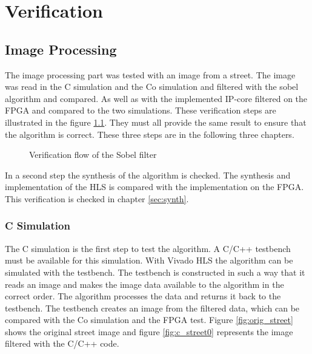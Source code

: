 \chapter{Verification} \label{chapt:verification}

%
%
\section{Image Processing}
The image processing part was tested with an image from a street. The image was read in the C simulation and the Co simulation and filtered with the sobel algorithm and compared. As well as with the implemented IP-core filtered on the FPGA and compared to the two simulations. These verification steps are illustrated in the figure \ref{fig:ip_validation}. They must all provide the same result to ensure that the algorithm is correct. These three steps are in the following three chapters.

\begin{figure}[b!]
    \centering
    \begin{adjustbox}{width=0.5\textwidth}
        
    \end{adjustbox}
    \caption{Verification flow of the Sobel filter}
    \label{fig:ip_validation}
\end{figure}

In a second step the synthesis of the algorithm is checked. The synthesis and implementation of the HLS is compared with the implementation on the FPGA. This verification is checked in chapter \ref{sec:synth}.

%
%

\subsection{C Simulation} \label{sec:csim}

The C simulation is the first step to test the algorithm. A C/C++ testbench must be available for this simulation. With Vivado HLS the algorithm can be simulated with the testbench.
The testbench is constructed in such a way that it reads an image and makes the image data available to the algorithm in the correct order. The algorithm processes the data and returns it back to the testbench. The testbench creates an image from the filtered data, which can be compared with the Co simulation and the FPGA test. Figure \ref{fig:orig_street} shows the original street image and figure \ref{fig:c_street0} represents the image filtered with the C/C++ code.


